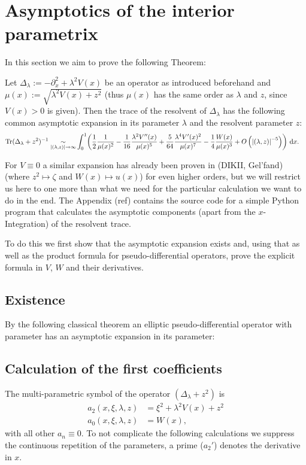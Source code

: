 \section{Asymptotics of the interior parametrix}
In this section we aim to prove the following Theorem:
\begin{MainTheorem}
  Let $\Delta_\lambda := -\partial_x^2 + \lambda^2V(x) $ be an operator as
  introduced beforehand and $\mu(x) := \sqrt{\lambda^2 V(x) + z^2}$ (thus
  $\mu(x)$ has the same order as $\lambda$ and $z$, since $V(x) > 0$ is given).
  Then the trace of the resolvent of $\Delta_\lambda$ has the following common
  asymptotic expansion in its parameter $\lambda$ and the resolvent parameter
  $z$:
  \begin{align*}
  \Tr(\Delta_\lambda + z^2)^{-1} \SimAs{\Abs{(\lambda, z)}\to\infty}&
   \Int{x}{\left(
      \frac12\frac1{\mu(x)^{2}}
     -\frac1{16}\frac{\lambda^2 V''(x)}{\mu(x)^5}
     +\frac{5}{64}\frac{\lambda^4V'(x)^2}{\mu(x)^7}
     -\frac14\frac{W(x)}{\mu(x)^3}
     +O\left(\Abs{(\lambda, z)}^{-5}\right)
   \right)}.
  \end{align*}
  \begin{Remark}
    For $V\equiv 0$ a similar expansion has already been proven in (DIKII,
    Gel'fand) (where $z^2 \mapsto \zeta$ and $W(x) \mapsto u(x)$) for even
    higher orders, but we will restrict us here to one more than what we need
    for the particular calculation we want to do in the end.  The Appendix (ref)
    contains the source code for a simple Python program that calculates the
    asymptotic components (apart from the $x$-Integration) of the resolvent
    trace.
  \end{Remark}
\end{MainTheorem}
To do this we first show that the asymptotic expansion exists and, using that as
well as the product formula for pseudo-differential operators, prove the
explicit formula in $V$, $W$ and their derivatives.
\subsection{Existence}
By the following classical theorem an elliptic pseudo-differential operator with
parameter has an asymptotic expansion in its parameter:

\begin{Proof}
\end{Proof}

\subsection{Calculation of the first coefficients}
The multi-parametric symbol of the operator $(\Delta_\lambda + z^2)$ is
\begin{align}
  a_2(x,\xi,\lambda,z) &= \xi^2 + \lambda^2 V(x) + z^2 \\
  a_0(x,\xi,\lambda,z) &= W(x),
  \label{eqn:symbol}
\end{align}
with all other $a_n \equiv 0$. To not complicate the following calculations we
suppress the continuous repetition of the parameters, a prime ($a_2'$) denotes
the derivative in $x$.

